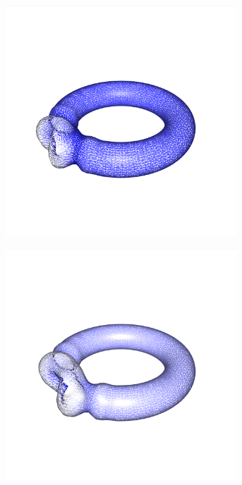 \documentclass[crop=false]{standalone}
\begin{document}
\begin{figure}[b]
\begin{subfigure}[b]{0.24\textwidth}
        \caption{}
      \end{subfigure}
      \begin{subfigure}[b]{0.24\textwidth}
        \center
        \includegraphics[trim={0.2cm 3.9cm 3.15cm 5.8cm},clip,width=0.95\textwidth]{images/torus_wave_2.png}
        \caption{}
      \end{subfigure}
      \begin{subfigure}[b]{0.24\textwidth}
        \center
        \includegraphics[trim={0.2cm 3.9cm 3.15cm 5.8cm},clip,width=0.95\textwidth]{images/torus_wave_3.png}
        \caption{}
      \end{subfigure}


\end{figure}
\end{document}

